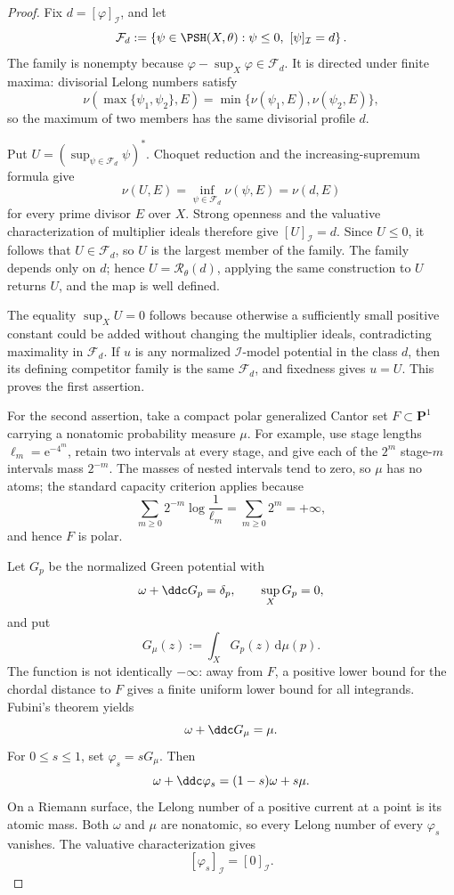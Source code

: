 \begin{proof}
Fix \(d=[\varphi]_{\mathcal I}\), and let
\[
 \mathcal F_d:=\left\{\psi\in\PSH(X,\theta):
             \psi\leq0,\ [\psi]_{\mathcal I}=d\right\}.
\]
The family is nonempty because
\(\varphi-\sup_X\varphi\in\mathcal F_d\).  It is directed under finite
maxima: divisorial Lelong numbers satisfy
\[
 \nu(\max\{\psi_1,\psi_2\},E)
   =\min\{\nu(\psi_1,E),\nu(\psi_2,E)\},
\]
so the maximum of two members has the same divisorial profile \(d\).

Put \(U=(\sup_{\psi\in\mathcal F_d}\psi)^*\).  Choquet reduction and the
increasing-supremum formula give
\[
 \nu(U,E)=\inf_{\psi\in\mathcal F_d}\nu(\psi,E)=\nu(d,E)
\]
for every prime divisor \(E\) over \(X\).  Strong openness and the valuative
characterization of multiplier ideals therefore give
\([U]_{\mathcal I}=d\).  Since \(U\leq0\), it follows that
\(U\in\mathcal F_d\), so \(U\) is the largest member of the family.  The
family depends only on \(d\); hence \(U=\mathcal R_\theta(d)\), applying the
same construction to \(U\) returns \(U\), and the map is well defined.

The equality \(\sup_XU=0\) follows because otherwise a sufficiently small
positive constant could be added without changing the multiplier ideals,
contradicting maximality in \(\mathcal F_d\).  If \(u\) is any normalized
\(\mathcal I\)-model potential in the class \(d\), then its defining
competitor family is the same \(\mathcal F_d\), and fixedness gives
\(u=U\).  This proves the first assertion.

For the second assertion, take a compact polar generalized Cantor set
\(F\subset\mathbf P^1\) carrying a nonatomic probability measure \(\mu\).
For example, use stage lengths
\(\ell_m=\mathrm e^{-4^m}\), retain two intervals at every stage, and give
each of the \(2^m\) stage-\(m\) intervals mass \(2^{-m}\).  The masses of
nested intervals tend to zero, so \(\mu\) has no atoms; the standard
capacity criterion applies because
\[
 \sum_{m\geq0}2^{-m}\log\frac1{\ell_m}
 =\sum_{m\geq0}2^m=+\infty,
\]
and hence \(F\) is polar.

Let \(G_p\) be the normalized Green potential with
\[
 \omega+\ddc G_p=\delta_p,\qquad \sup_XG_p=0,
\]
and put
\[
 G_\mu(z):=\int_XG_p(z)\,\mathrm d\mu(p).
\]
The function is not identically \(-\infty\): away from \(F\), a positive
lower bound for the chordal distance to \(F\) gives a finite uniform lower
bound for all integrands.  Fubini's theorem yields
\[
 \omega+\ddc G_\mu=\mu.
\]
For \(0\leq s\leq1\), set \(\varphi_s=sG_\mu\).  Then
\begin{equation}
 \omega+\ddc\varphi_s=(1-s)\omega+s\mu.
 \label{eq:p148-cantor-current}
\end{equation}
On a Riemann surface, the Lelong number of a positive current at a point
is its atomic mass.  Both \(\omega\) and \(\mu\) are nonatomic, so every
Lelong number of every \(\varphi_s\) vanishes.  The valuative
characterization gives
\[
 [\varphi_s]_{\mathcal I}=[0]_{\mathcal I}.
\]


\end{proof}
